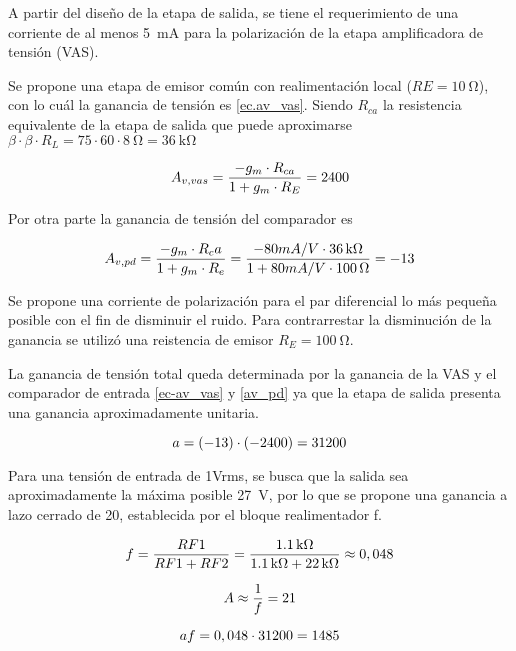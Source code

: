 A partir del diseño de la etapa de salida, se tiene el requerimiento de una corriente de al menos \SI{5}{\milli\ampere} para la polarización de la etapa amplificadora de tensión (VAS).

Se propone una etapa de emisor común con realimentación local ($RE = \SI{10}{\ohm}$), con lo cuál la ganancia de tensión es \eqref{ec.av_vas}. Siendo $R_{ca}$ la resistencia equivalente de la etapa de salida que puede aproximarse $\beta \cdot \beta \cdot R_L = 75 \cdot 60 \cdot \SI{8}{\ohm} = \SI{36}{\kilo\ohm}$

\begin{equation}
	\centering
	A_{v,vas} = \frac{-g_m \cdot R_{ca}}{1+g_m \cdot R_E} = 2400
	\label{ec.av_vas}
\end{equation}
	

Por otra parte la ganancia de tensión del comparador es

\begin{equation}
	\centering
	A_{v,pd} = \frac{-g_m \cdot R_ca}{1+g_m \cdot R_e} = \frac{-80mA/V \cdot \SI{36}{\kilo\ohm} }{ 1 + 80mA/V \cdot \SI{100}{\ohm} } = -13
	\label{ec.av_pd}
\end{equation}

Se propone una corriente de polarización para el par diferencial lo más pequeña posible con el fin de disminuir el ruido. Para contrarrestar la disminución de la ganancia se utilizó una reistencia de emisor $R_E=\SI{100}{\ohm}$.


La ganancia de tensión total queda determinada por la ganancia de la VAS y el comparador de entrada \eqref{ec-av_vas} y \eqref{av_pd} ya que la etapa de salida presenta una ganancia aproximadamente unitaria.

\begin{equation}
	\centering
	a = (-13) \cdot (-2400) = 31200
	\label{ec.a}
\end{equation}

Para una tensión de entrada de 1Vrms, se busca que la salida sea aproximadamente la máxima posible \SI{27}{\volt}, por lo que se propone una ganancia a lazo cerrado de 20, establecida por el bloque realimentador f.

\begin{equation}
	\centering
	f = \frac{RF1}{RF1 + RF2} = \frac{\SI{1.1}{\kilo\ohm}}{\SI{1.1}{\kilo\ohm} + \SI{22}{\kilo\ohm}} \approx 0,048
\end{equation}

\begin{equation}
	\centering
	A \approx \frac{1}{f} = 21
\end{equation}	


\begin{equation}
	\centering
	af = 0,048 \cdot 31200 = 1485
	\end{equation}

	
	






